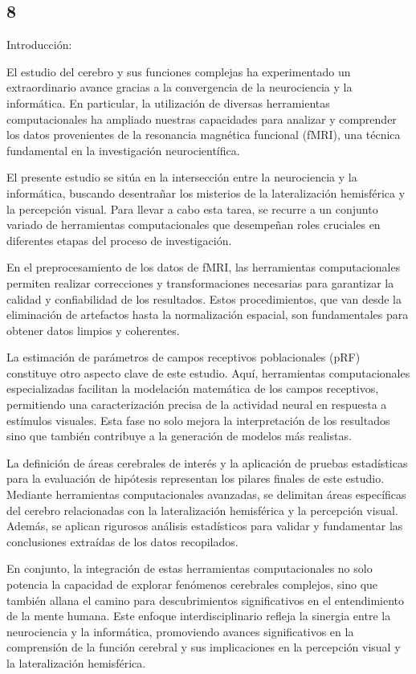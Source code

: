 \documentclass{article}
\begin{document}
	\subsection{8}
	
	Introducción:
	
	El estudio del cerebro y sus funciones complejas ha experimentado un extraordinario avance gracias a la convergencia de la neurociencia y la informática. En particular, la utilización de diversas herramientas computacionales ha ampliado nuestras capacidades para analizar y comprender los datos provenientes de la resonancia magnética funcional (fMRI), una técnica fundamental en la investigación neurocientífica.
	
	El presente estudio se sitúa en la intersección entre la neurociencia y la informática, buscando desentrañar los misterios de la lateralización hemisférica y la percepción visual. Para llevar a cabo esta tarea, se recurre a un conjunto variado de herramientas computacionales que desempeñan roles cruciales en diferentes etapas del proceso de investigación.
	
	En el preprocesamiento de los datos de fMRI, las herramientas computacionales permiten realizar correcciones y transformaciones necesarias para garantizar la calidad y confiabilidad de los resultados. Estos procedimientos, que van desde la eliminación de artefactos hasta la normalización espacial, son fundamentales para obtener datos limpios y coherentes.
	
	La estimación de parámetros de campos receptivos poblacionales (pRF) constituye otro aspecto clave de este estudio. Aquí, herramientas computacionales especializadas facilitan la modelación matemática de los campos receptivos, permitiendo una caracterización precisa de la actividad neural en respuesta a estímulos visuales. Esta fase no solo mejora la interpretación de los resultados sino que también contribuye a la generación de modelos más realistas.
	
	La definición de áreas cerebrales de interés y la aplicación de pruebas estadísticas para la evaluación de hipótesis representan los pilares finales de este estudio. Mediante herramientas computacionales avanzadas, se delimitan áreas específicas del cerebro relacionadas con la lateralización hemisférica y la percepción visual. Además, se aplican rigurosos análisis estadísticos para validar y fundamentar las conclusiones extraídas de los datos recopilados.
	
	En conjunto, la integración de estas herramientas computacionales no solo potencia la capacidad de explorar fenómenos cerebrales complejos, sino que también allana el camino para descubrimientos significativos en el entendimiento de la mente humana. Este enfoque interdisciplinario refleja la sinergia entre la neurociencia y la informática, promoviendo avances significativos en la comprensión de la función cerebral y sus implicaciones en la percepción visual y la lateralización hemisférica.
	
\end{document}
